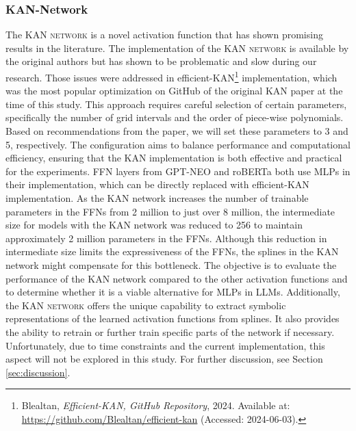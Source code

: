 
\subsubsection{KAN-Network}
The \textsc{KAN network} is a novel activation function that has shown promising results in the literature. The implementation of the \textsc{KAN network} is available by the original authors but has shown to be problematic and slow during our research. Those issues were addressed in efficient-KAN\footnote{\label{footnote:efficient-kan}Blealtan, \textit{Efficient-KAN, GitHub Repository}, 2024. Available at: \url{https://github.com/Blealtan/efficient-kan} (Accessed: 2024-06-03).} implementation, which was the most popular optimization on GitHub of the original KAN paper at the time of this study. This approach requires careful selection of certain parameters, specifically the number of grid intervals and the order of piece-wise polynomials. Based on recommendations from the paper, we will set these parameters to 3 and 5, respectively. The configuration aims to balance performance and computational efficiency, ensuring that the KAN implementation is both effective and practical for the experiments. FFN layers from GPT-NEO and roBERTa both use MLPs in their implementation, which can be directly replaced with efficient-KAN implementation. As the KAN network increases the number of trainable parameters in the FFNs from 2 million to just over 8 million, the intermediate size for models with the KAN network was reduced to 256 to maintain approximately 2 million parameters in the FFNs. Although this reduction in intermediate size limits the expressiveness of the FFNs, the splines in the KAN network might compensate for this bottleneck.
The objective is to evaluate the performance of the KAN network compared to the other activation functions and to determine whether it is a viable alternative for MLPs in LLMs. Additionally, the \textsc{KAN network} offers the unique capability to extract symbolic representations of the learned activation functions from splines. It also provides the ability to retrain or further train specific parts of the network if necessary. Unfortunately, due to time constraints and the current implementation, this aspect will not be explored in this study. For further discussion, see Section \ref{sec:discussion}.